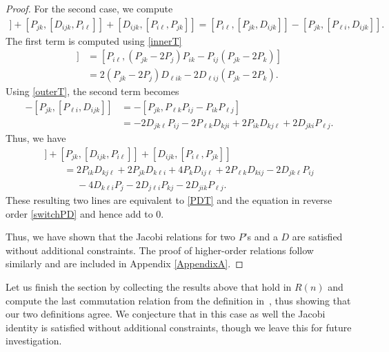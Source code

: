 \documentclass[10pt,a4paper]{amsart}
\numberwithin{equation}{section}
\begin{document}
\begin{proof}
For the second case, we compute
\begin{gather*}
  [ P_{i\ell}, [ P_{jk} , D_{ijk}]] + [P_{jk}, [ D_{ijk}, P_{i\ell}]]+ [ D_{ijk}, [P_{i\ell}, P_{jk}]]
 = [ P_{i\ell}, [ P_{jk} , D_{ijk}]] - [ P_{jk}, [ P_{\ell i} , D_{ijk}]].
\end{gather*}
The first term is computed using \eqref{innerT}
\begin{align*}
[ P_{i\ell}, [ P_{jk} , D_{ijk}]]& = [ P_{i\ell},  (P_{jk}-2P_j )P_{ik} - P_{ij} ( P_{jk}-2P_k )] \\
& = 2 (P_{jk}-2P_j )D_{\ell i k} - 2 D_{\ell i j} ( P_{jk}-2P_k ).
\end{align*}
Using \eqref{outerT}, the second term becomes
\begin{align*}
- [ P_{jk}, [ P_{\ell i} , D_{ijk}]] &= - [P_{jk}, P_{\ell k} P_{ij} - P_{ik} P_{\ell j}] \\
&= - 2 D_{jk\ell}P_{ij} -2 P_{\ell k} D_{kji}+2P_{ik}D_{kj\ell}+2 D_{jki} P_{\ell j}.
\end{align*}
Thus, we have
\begin{gather*}
  [ P_{i\ell}, [ P_{jk} , D_{ijk}]] + [P_{jk}, [ D_{ijk}, P_{i\ell}]]+ [ D_{ijk}, [P_{i\ell}, P_{jk}]]\\
\qquad= 2P_{ik}D_{kj\ell} +2P_{jk}D_{k \ell i} +4P_kD_{ij \ell} + 2P_{\ell k} D_{k ij} -2 D_{jk \ell}P_{ij}\\
\phantom{\qquad=}{}- 4 D_{k \ell i}P_j -2D_{j\ell i } P_{ kj}-2D_{j i k}P_{\ell j}.
\end{gather*}
These resulting two lines are equivalent to \eqref{PDT} and the equation in reverse order \eqref{switchPD} and hence add to 0.

Thus, we have shown that the Jacobi relations for two $P$'s and a $D$ are satisfied without additional constraints.
The proof of higher-order relations follow similarly and are included in Appendix \ref{AppendixA}.
\end{proof}


Let us finish the section by collecting the results above that hold in $R(n)$ and compute the last commutation relation from the definition in~\cite{CGPAV22}, thus showing that our two definitions agree. We conjecture that in this case as well the Jacobi identity is satisfied without additional constraints, though we leave this for future investigation.
\end{document}
